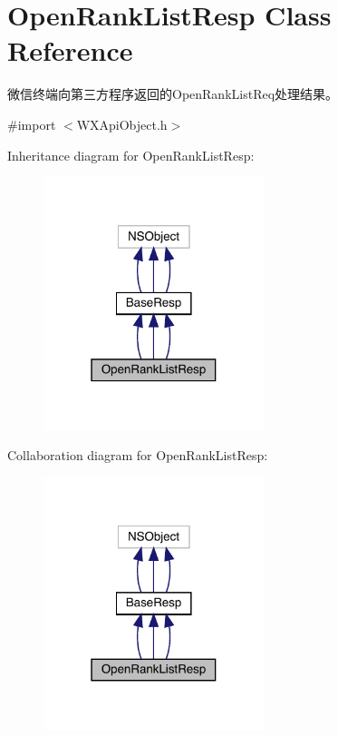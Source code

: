 \hypertarget{interface_open_rank_list_resp}{}\section{Open\+Rank\+List\+Resp Class Reference}
\label{interface_open_rank_list_resp}


微信终端向第三方程序返回的\+Open\+Rank\+List\+Req处理结果。  




{\ttfamily \#import $<$W\+X\+Api\+Object.\+h$>$}



Inheritance diagram for Open\+Rank\+List\+Resp\+:\nopagebreak
\begin{figure}[H]
\begin{center}
\leavevmode
\includegraphics[width=183pt]{interface_open_rank_list_resp__inherit__graph}
\end{center}
\end{figure}


Collaboration diagram for Open\+Rank\+List\+Resp\+:\nopagebreak
\begin{figure}[H]
\begin{center}
\leavevmode
\includegraphics[width=183pt]{interface_open_rank_list_resp__coll__graph}
\end{center}
\end{figure}

